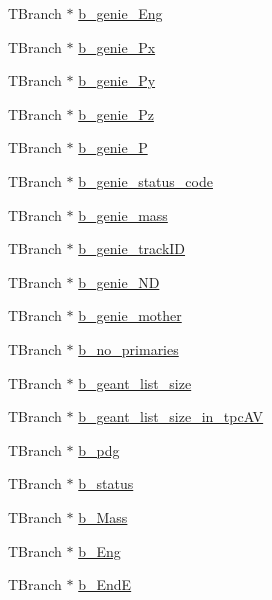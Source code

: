 \begin{DoxyCompactItemize}
\item 
T\-Branch $\ast$ \hyperlink{classanatree_a16458ca4cb41a63c31daa341db5da251}{b\-\_\-genie\-\_\-\-Eng}
\item 
T\-Branch $\ast$ \hyperlink{classanatree_a4461eb0668e09bac7267bafc18dce9b3}{b\-\_\-genie\-\_\-\-Px}
\item 
T\-Branch $\ast$ \hyperlink{classanatree_a7a98969216617c910e72975a1ff31d03}{b\-\_\-genie\-\_\-\-Py}
\item 
T\-Branch $\ast$ \hyperlink{classanatree_a6e5e3fa784472042f877267c2ab1593e}{b\-\_\-genie\-\_\-\-Pz}
\item 
T\-Branch $\ast$ \hyperlink{classanatree_a69b72987e24babf9f1fe5fc812c533af}{b\-\_\-genie\-\_\-\-P}
\item 
T\-Branch $\ast$ \hyperlink{classanatree_a03fa50d25c4b11f5c0903ab816008bd5}{b\-\_\-genie\-\_\-status\-\_\-code}
\item 
T\-Branch $\ast$ \hyperlink{classanatree_acd3c9015618983ea55cd390cf8931ded}{b\-\_\-genie\-\_\-mass}
\item 
T\-Branch $\ast$ \hyperlink{classanatree_a76511019966b4c85d648021a9f472620}{b\-\_\-genie\-\_\-track\-I\-D}
\item 
T\-Branch $\ast$ \hyperlink{classanatree_aa3fba1f98f0b39993b337b87bf0505ff}{b\-\_\-genie\-\_\-\-N\-D}
\item 
T\-Branch $\ast$ \hyperlink{classanatree_ac125d9de5570958ba45bda699adc76f4}{b\-\_\-genie\-\_\-mother}
\item 
T\-Branch $\ast$ \hyperlink{classanatree_a5103ef779eea8e02c35a28799adc68e2}{b\-\_\-no\-\_\-primaries}
\item 
T\-Branch $\ast$ \hyperlink{classanatree_a93b176b810cb70bbbc3a4f3637d34ca0}{b\-\_\-geant\-\_\-list\-\_\-size}
\item 
T\-Branch $\ast$ \hyperlink{classanatree_a2fe631d23ec23018bb07c1df4dc5a086}{b\-\_\-geant\-\_\-list\-\_\-size\-\_\-in\-\_\-tpc\-A\-V}
\item 
T\-Branch $\ast$ \hyperlink{classanatree_a6ce3421042e93cbabce4cf9b911493e3}{b\-\_\-pdg}
\item 
T\-Branch $\ast$ \hyperlink{classanatree_a487bfb75aa043108e21fded2b86bbe61}{b\-\_\-status}
\item 
T\-Branch $\ast$ \hyperlink{classanatree_a4835ac5ebfbbd9949152d78786854fa4}{b\-\_\-\-Mass}
\item 
T\-Branch $\ast$ \hyperlink{classanatree_ad4dcfa13b890ce03a9227f2d1ec6ccb2}{b\-\_\-\-Eng}
\item 
T\-Branch $\ast$ \hyperlink{classanatree_ab5d2fc7e9d5738fd4ac62337b5f1d46f}{b\-\_\-\-End\-E}

\end{DoxyCompactItemize}
